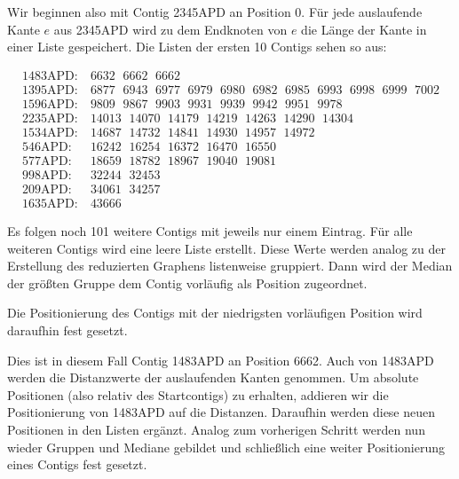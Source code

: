 Wir beginnen also mit Contig 2345APD an Position 0. Für jede auslaufende Kante $e$ aus 2345APD wird zu dem Endknoten von $e$ die Länge der Kante in einer Liste gespeichert. Die Listen der ersten 10 Contigs sehen so aus: 

\begin{footnotesize}
\begin{align*}
\text{1483APD:}&\ 6632\ \ \,6662\ \ \,6662\\
\text{1395APD:}&\ 6877\ \ \,6943\ \ \,6977\ \ \,6979\ \ \,6980\ \ \,6982\ \ \,6985\ \ \,6993\ \ \,6998\ \ \,6999\ \ \,7002\\
\text{1596APD:}&\ 9809\ \ \,9867\ \ \,9903\ \ \,9931\ \ \,9939\ \ \,9942\ \ \,9951\ \ \,9978\\
\text{2235APD:}&\ 14013\ \ \,14070\ \ \,14179\ \ \,14219\ \ \,14263\ \ \,14290\ \ \,14304\\
\text{1534APD:}&\ 14687\ \ \,14732\ \ \,14841\ \ \,14930\ \ \,14957\ \ \,14972\\
\text{546APD:}&\ 16242\ \ \,16254\ \ \,16372\ \ \,16470\ \ \,16550\\
\text{577APD:}&\ 18659\ \ \,18782\ \ \,18967\ \ \,19040\ \ \,19081\\
\text{998APD:}&\ 32244\ \ \,32453\\
\text{209APD:}&\ 34061\ \ \,34257\\
\text{1635APD:}&\ 43666
\end{align*}
\end{footnotesize}

Es folgen noch 101 weitere Contigs mit jeweils nur einem Eintrag. 
Für alle weiteren Contigs wird eine leere Liste erstellt.
Diese Werte werden analog zu der Erstellung des reduzierten Graphens listenweise gruppiert. Dann wird der Median der größten Gruppe dem Contig vorläufig als Position zugeordnet.

Die Positionierung des Contigs mit der niedrigsten vorläufigen Position wird daraufhin fest gesetzt.

Dies ist in diesem Fall Contig 1483APD an Position 6662. Auch von 1483APD werden die Distanzwerte der auslaufenden Kanten genommen. 
Um absolute Positionen (also relativ des Startcontigs) zu erhalten, addieren wir die Positionierung von 1483APD auf die Distanzen. Daraufhin werden diese neuen Positionen in den Listen ergänzt. Analog zum vorherigen Schritt werden nun wieder Gruppen und Mediane gebildet und schließlich eine weiter Positionierung eines Contigs fest gesetzt.


